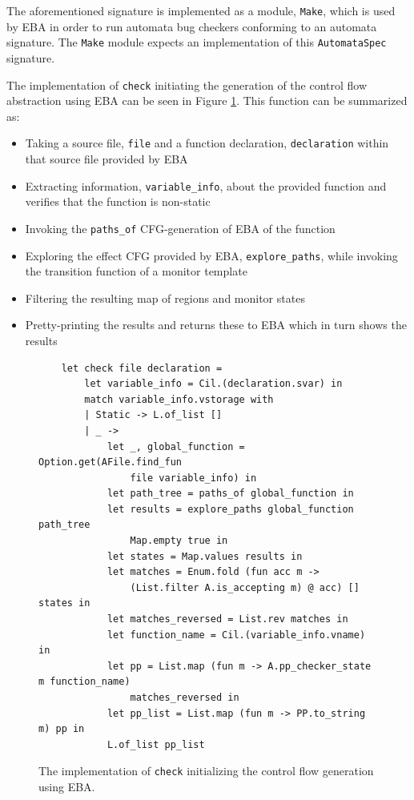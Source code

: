 \newpar The aforementioned signature is implemented as a module, \texttt{Make}, which is used by EBA in order to run automata bug checkers conforming to an automata signature. The \texttt{Make} module expects an implementation of this \texttt{AutomataSpec} signature. 

\noindent The implementation of \texttt{check} initiating the generation of the control flow abstraction using EBA can be seen in Figure \ref{check-implementation}. This function can be summarized as:

\begin{itemize}
    \item Taking a source file, \texttt{file} and a function declaration, \texttt{declaration} within that source file provided by EBA
    \item Extracting information, \texttt{variable\_info}, about the provided function and verifies that the function is non-static
    \item Invoking the \texttt{paths\_of} CFG-generation of EBA of the function
    \item Exploring the effect CFG provided by EBA, \texttt{explore\_paths}, while invoking the transition function of a monitor template
    \item Filtering the resulting map of regions and monitor states
    \item Pretty-printing the results and returns these to EBA which in turn shows the results 
\end{itemize}

\begin{figure}[H]
    \centering
    \begin{verbatim}
    let check file declaration =
        let variable_info = Cil.(declaration.svar) in
        match variable_info.vstorage with 
        | Static -> L.of_list []
        | _ ->
            let _, global_function = Option.get(AFile.find_fun 
                file variable_info) in
            let path_tree = paths_of global_function in
            let results = explore_paths global_function path_tree 
                Map.empty true in 
            let states = Map.values results in
            let matches = Enum.fold (fun acc m -> 
                (List.filter A.is_accepting m) @ acc) [] states in
            let matches_reversed = List.rev matches in 
            let function_name = Cil.(variable_info.vname) in 
            let pp = List.map (fun m -> A.pp_checker_state m function_name) 
                matches_reversed in
            let pp_list = List.map (fun m -> PP.to_string m) pp in
            L.of_list pp_list
    \end{verbatim}
    \caption{The implementation of \texttt{check} initializing the control flow generation using EBA.}
    \label{check-implementation}
\end{figure}

